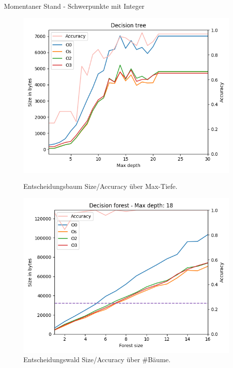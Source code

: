 \documentclass[10pt]{beamer}
\begin{document}
\begin{frame}{Momentaner Stand - Schwerpunkte mit Integer}
\begin{figure}
    \begin{minipage}[c]{0.4\linewidth}
        \includegraphics[width=\linewidth]{klisch_int_tree.png}
        \caption{Entscheidungsbaum Size/Accuracy über Max-Tiefe.}
    \end{minipage}
    \hfill
    \begin{minipage}[c]{0.4\linewidth}
        \includegraphics[width=\linewidth]{klisch_int_forest_18.png}
        \caption{Entscheidungswald Size/Accuracy über \#Bäume.}
    \end{minipage}%
\end{figure}

\end{frame}
\end{document}
